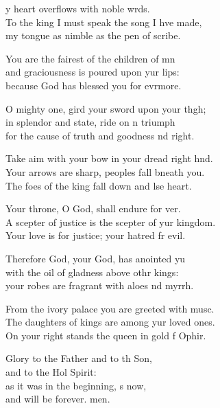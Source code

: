 \settowidth{\versewidth}{A scepter of justice is the scepter of your kingdom. *}
\begin{psalmverse}%
  \begin{patverse}
y heart overflows with noble wrds.\Flex\\
To the king I must speak the song I hve made,\Med\\
my tongue as nimble as the pen of  scribe.

You are the fairest of the children of mn\Flex\\
and graciousness is poured upon yur lips:\Med\\
because God has blessed you for evrmore.

O mighty one, gird your sword upon your th\pointup{\i}gh;\Flex\\
in splendor and state, ride on \pointup{\i}n triumph\Med\\
for the cause of truth and goodness nd right.

Take aim with your bow in your dread right hnd.\Flex\\
Your arrows are sharp, peoples fall bneath you.\Med\\
The foes of the king fall down and lse heart.

Your throne, O God, shall endure for ver.\Flex\\
A scepter of justice is the scepter of yur kingdom.\Med\\
Your love is for justice; your hatred fr evil.

Therefore God, your God, has anointed yu\Flex\\
with the oil of gladness above othr kings:\Med\\
your robes are fragrant with aloes nd myrrh.

From the ivory palace you are greeted with mus\pointup{\i}c.\Flex\\
The daughters of kings are among yur loved ones.\Med\\
On your right stands the queen in gold f Ophir.

Glory to the Father and to th Son,\Med\\
and to the Hol Spirit:\\
as it was in the beginning, \pointup{\i}s now,\Med\\
and will be forever. men. 
  \end{patverse}
\end{psalmverse}
